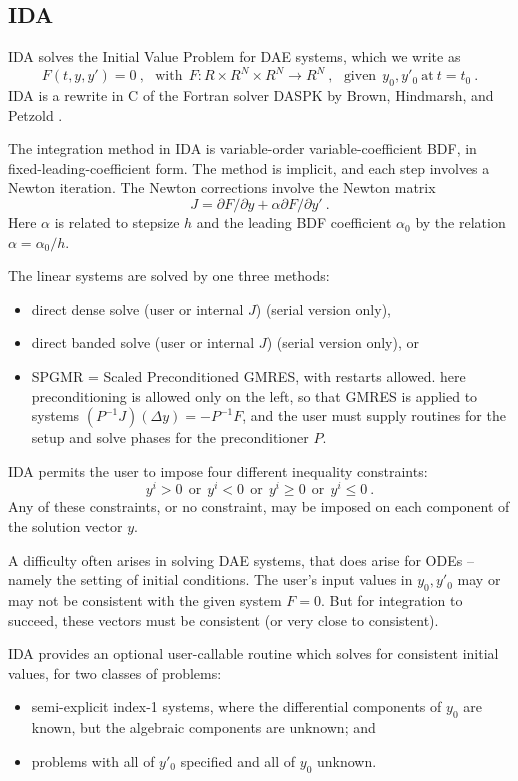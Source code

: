 \subsection{IDA}

IDA solves the  Initial Value Problem for DAE systems, which we write as
\[ F(t,y,y') = 0 ~,~~~
   \mbox{with} ~~ F:R \times R^N \times R^N \rightarrow R^N ~,~~~
   \mbox{given} ~~ y_0, y'_0 ~\mbox{at}~ t = t_0 ~. \]
IDA is a rewrite in C of the Fortran solver DASPK by Brown, Hindmarsh,
and Petzold \cite{BHP:94}.

The integration method in IDA is variable-order variable-coefficient
BDF, in fixed-leading-coefficient form.  The method is implicit, and
each step involves a Newton iteration.  The Newton corrections involve
the Newton matrix
\[ J = \partial F / \partial y + \alpha \partial F / \partial y' ~. \]
Here $\alpha$ is related to stepsize $h$ and the leading BDF
coefficient $\alpha_0$ by the relation $\alpha = \alpha_0/h$.

The linear systems are solved by one three methods:
\vspace*{-.19in}
\begin{itemize}
\item direct dense solve (user or internal $J$) (serial version only),
\item direct banded solve (user or internal $J$) (serial version
      only), or
\item SPGMR = Scaled Preconditioned GMRES, with restarts allowed.
      here preconditioning is allowed only on the left, so that GMRES
      is applied to systems $(P^{-1}J)(\Delta y) = -P^{-1}F$, and
      the user must supply routines for the setup and solve phases for
      the preconditioner $P$.
\end{itemize}

IDA permits the user to impose four different inequality constraints:
\[ y^i > 0~~ \mbox{or} ~~ y^i < 0~~ \mbox{or} ~~y^i \geq 0~~
              \mbox{or} ~~y^i \leq 0 ~.\]
Any of these constraints, or no constraint, may be imposed on each
component of the solution vector $y$.

A difficulty often arises in solving DAE systems, that does arise for
ODEs -- namely the setting of initial conditions.  The user's input
values in $y_0, y'_0$ may or may not be consistent with the given
system $F = 0$.  But for integration to succeed, these vectors must
be consistent (or very close to consistent).

IDA provides an optional user-callable routine \cite{BHP:98} which
solves for consistent initial values, for two classes of problems:
\vspace*{-.19in}
\begin{itemize}
\item semi-explicit index-1 systems, where the differential components
of $y_0$ are known, but the algebraic components are unknown; and
\item problems with all of $y'_0$ specified and all of $y_0$ unknown.
\end{itemize}

